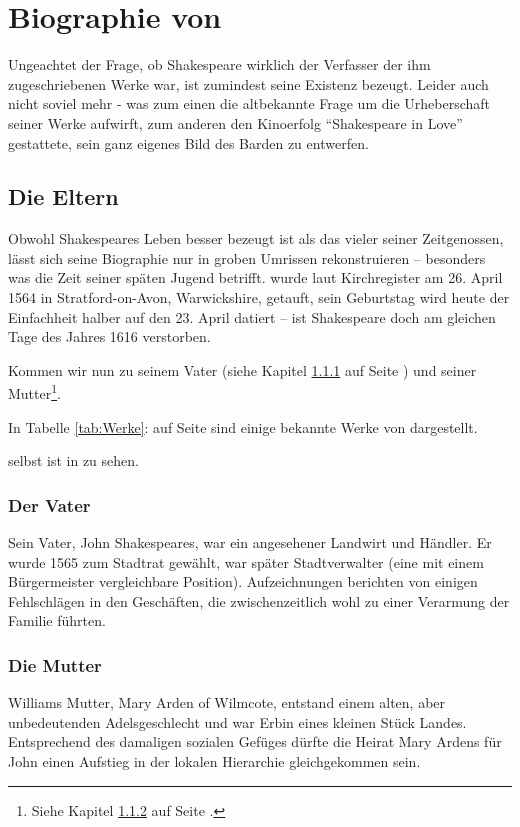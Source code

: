 \chapter{Biographie von \WS}

Ungeachtet der Frage, ob Shakespeare wirklich der Verfasser der ihm
zugeschriebenen Werke war, ist zumindest seine Existenz bezeugt. Leider auch
nicht soviel mehr - was zum einen die altbekannte Frage um die Urheberschaft
seiner Werke aufwirft, zum anderen den Kinoerfolg "`Shakespeare in Love"'
gestattete, sein ganz eigenes Bild des Barden zu entwerfen.

\section[Die Erzeuger]{Die Eltern}
\label{sec:Eltern}

Obwohl Shakespeares Leben besser bezeugt ist als das vieler seiner
Zeitgenossen, lässt sich seine Biographie nur in groben Umrissen rekonstruieren
-- besonders was die Zeit seiner späten Jugend betrifft. \WS
wurde laut Kirchregister am 26. April 1564 in Stratford-on-Avon, Warwickshire,
getauft, sein Geburtstag wird heute der Einfachheit halber auf den 23. April
datiert -- ist Shakespeare doch am gleichen Tage des Jahres 1616 verstorben.

Kommen wir nun zu seinem Vater (siehe Kapitel \ref{sub:Vater} auf Seite
\pageref{sub:Vater}) und seiner Mutter\footnote{Siehe Kapitel \ref{sub:Mutter}
auf Seite \pageref{sub:Mutter}.}.

In Tabelle \ref{tab:Werke}:  auf Seite \pageref{tab:Werke}
sind einige bekannte Werke von \WS dargestellt.

\WS{} selbst ist in  zu sehen.

\subsection{Der Vater}
\label{sub:Vater}
Sein Vater, John Shakespeares, war ein angesehener Landwirt und Händler. Er
wurde 1565 zum Stadtrat gewählt, war später Stadtverwalter (eine mit einem
Bürgermeister vergleichbare Position). Aufzeichnungen berichten von einigen
Fehlschlägen in den Geschäften, die zwischenzeitlich wohl zu einer Verarmung
der Familie führten.

\subsection{Die Mutter}
\label{sub:Mutter}
Williams Mutter, Mary Arden of Wilmcote, entstand einem
alten, aber unbedeutenden Adelsgeschlecht und war Erbin eines kleinen Stück
Landes. Entsprechend des damaligen sozialen Gefüges dürfte die Heirat Mary
Ardens für John einen Aufstieg in der lokalen Hierarchie gleichgekommen sein.


